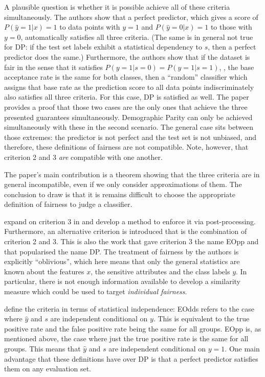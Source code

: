 A plausible question is whether it is possible achieve all of these criteria simultaneously.
The authors show that a perfect predictor,
which gives a score of \(P(\hat{y}=1|x) = 1\) to data points with \(y=1\)
and \(P(\hat{y}=0|x) = 1\) to those with \(y=0\),
automatically satisfies all three criteria.
(The same is in general not true for \ac{DP}:
if the test set labels exhibit a statistical dependency to $s$, then a perfect predictor does the same.)
Furthermore, the authors show that if the dataset is fair in the sense that it satisfies \(P(y=1|s=0) = P(y=1|s=1)\),
\ie, the base acceptance rate is the same for both classes,
then a ``random'' classifier which assigns that base rate as the prediction score to all data points indiscriminately
also satisfies all three criteria.
For this case, \ac{DP} is satisfied as well.
The paper provides a proof
that those two cases are the only ones that achieve the three presented guarantees simultaneously.
Demographic Parity can only be achieved simultaneously with these in the second scenario.
The general case sits between those extremes:
the predictor is not perfect and the test set is not unbiased,
and therefore, these definitions of fairness are not compatible.
Note, however, that criterion 2 and 3 \emph{are} compatible with one another.

The paper's main contribution is a theorem showing that the three criteria are in general incompatible,
even if we only consider approximations of them.
The conclusion to draw is
that it is remains difficult to choose the appropriate definition of fairness to judge a classifier.

\citet{hardt2016equality} expand on criterion 3 in \citet{kleinberg2016inherent}
and develop a method to enforce it via post-processing.
Furthermore, an alternative criterion is introduced that is the combination of criterion 2 and 3.
This is also the work that gave criterion 3 the name \acl{EOpp}
and that popularised the name \acl{DP}.
The treatment of fairness by the authors is explicitly ``oblivious'',
which here means that only the general statistics are known
about the features \(x\), the sensitive attributes and the class labels \(y\).
In particular, there is not enough information available to develop a similarity measure
which could be used to target \emph{individual fairness}.

\citet{hardt2016equality} define the criteria in terms of statistical independence:
\acf{EOdds} refers to the case where \(\hat{y}\) and \(s\) are independent conditional on \(y\).
This is equivalent to the true positive rate and the false positive rate being the same for all groups.
\ac{EOpp} is, as mentioned above,
the case where just the true positive rate is the same for all groups.
This means that \(\hat{y}\) and \(s\) are independent conditional on \(y=1\).
One main advantage that these definitions have over \ac{DP} is that a perfect predictor satisfies them on any evaluation set.

